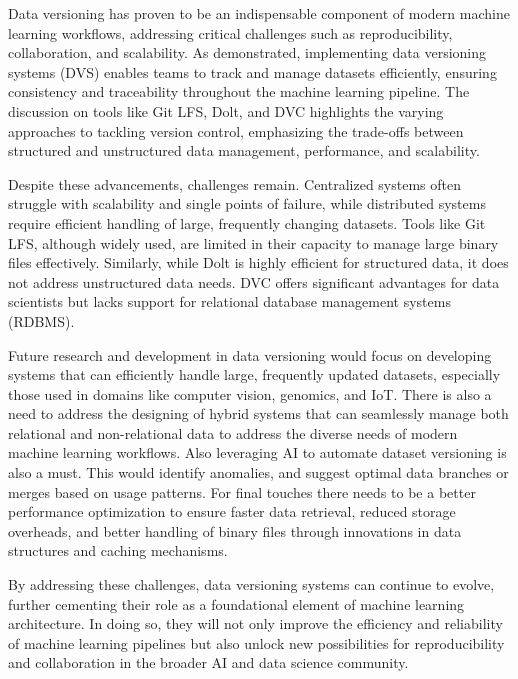 Data versioning has proven to be an indispensable 
component of modern machine learning workflows, 
addressing critical challenges such as reproducibility, 
collaboration, and scalability. As demonstrated, implementing 
data versioning systems (DVS) enables teams to track and 
manage datasets efficiently, ensuring consistency and 
traceability throughout the machine learning pipeline. 
The discussion on tools like Git LFS, Dolt, and DVC 
highlights the varying approaches to tackling version 
control, emphasizing the trade-offs between structured 
and unstructured data management, performance, and scalability.


Despite these advancements, challenges remain. Centralized 
systems often struggle with scalability and single points of 
failure, while distributed systems require efficient handling 
of large, frequently changing datasets. Tools like Git LFS, 
although widely used, are limited in their capacity to manage 
large binary files effectively. Similarly, while Dolt is 
highly efficient for structured data, it does not address 
unstructured data needs. DVC offers significant advantages 
for data scientists but lacks support for relational database 
management systems (RDBMS).

Future research and development in data versioning would focus 
on developing systems that can efficiently handle large, 
frequently updated datasets, especially those used in 
domains like computer vision, genomics, and IoT. 
There is also a need to address the designing of hybrid 
systems that can seamlessly manage both relational and 
non-relational data to address the diverse needs of modern 
machine learning workflows. Also leveraging AI to 
automate dataset versioning is also a must. This would 
identify anomalies, and suggest optimal data branches or 
merges based on usage patterns. For final touches there needs 
to be a better performance optimization to ensure faster 
data retrieval, reduced storage overheads, and better 
handling of binary files through innovations in data 
structures and caching mechanisms. 

By addressing these challenges, data versioning systems can 
continue to evolve, further cementing their role as a 
foundational element of machine learning architecture. 
In doing so, they will not only improve the efficiency and 
reliability of machine learning pipelines but also unlock new 
possibilities for reproducibility and collaboration in the 
broader AI and data science community.
